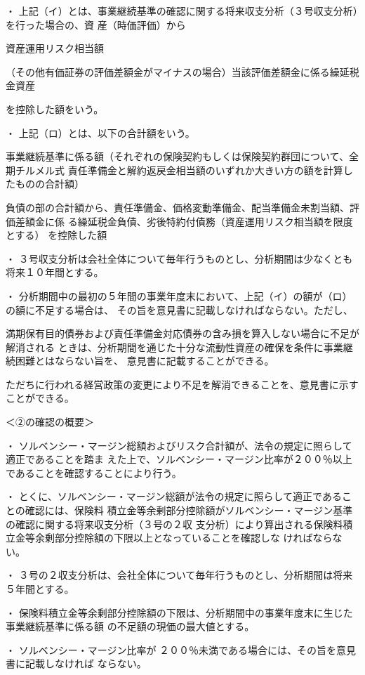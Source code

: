 \documentclass[report,gutter=10mm,fore-edge=10mm,uplatex,dvipdfmx]{jlreq}
\begin{document}
・ 上記（イ）とは、事業継続基準の確認に関する将来収支分析（３号収支分析）を行った場合の、資
産（時価評価）から

資産運用リスク相当額

（その他有価証券の評価差額金がマイナスの場合）当該評価差額金に係る繰延税金資産

を控除した額をいう。

・ 上記（ロ）とは、以下の合計額をいう。

事業継続基準に係る額（それぞれの保険契約もしくは保険契約群団について、全期チルメル式
責任準備金と解約返戻金相当額のいずれか大きい方の額を計算したものの合計額）

負債の部の合計額から、責任準備金、価格変動準備金、配当準備金未割当額、評価差額金に係
る繰延税金負債、劣後特約付債務（資産運用リスク相当額を限度とする） を控除した額

・ ３号収支分析は会社全体について毎年行うものとし、分析期間は少なくとも将来１０年間とする。

・ 分析期間中の最初の５年間の事業年度末において、上記（イ）の額が（ロ）の額に不足する場合は、
その旨を意見書に記載しなければならない。ただし、


満期保有目的債券および責任準備金対応債券の含み損を算入しない場合に不足が解消される
ときは、分析期間を通じた十分な流動性資産の確保を条件に事業継続困難とはならない旨を、
意見書に記載することができる。


ただちに行われる経営政策の変更により不足を解消できることを、意見書に示すことができる。

＜②の確認の概要＞

・ ソルベンシー・マージン総額およびリスク合計額が、法令の規定に照らして適正であることを踏ま
えた上で、ソルベンシー・マージン比率が２００％以上であることを確認することにより行う。

・ とくに、ソルベンシー・マージン総額が法令の規定に照らして適正であることの確認には、保険料
積立金等余剰部分控除額がソルベンシー・マージン基準の確認に関する将来収支分析（３号の２収
支分析）により算出される保険料積立金等余剰部分控除額の下限以上となっていることを確認しな
ければならない。

・ ３号の２収支分析は、会社全体について毎年行うものとし、分析期間は将来５年間とする。

・ 保険料積立金等余剰部分控除額の下限は、分析期間中の事業年度末に生じた事業継続基準に係る額
の不足額の現価の最大値とする。

・ ソルベンシー・マージン比率が ２００％未満である場合には、その旨を意見書に記載しなければ
ならない。
\end{document}
